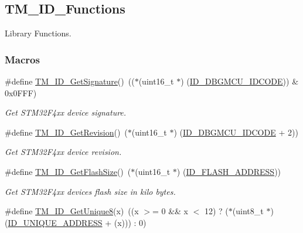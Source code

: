 \hypertarget{group___t_m___i_d___functions}{}\subsection{T\+M\+\_\+\+I\+D\+\_\+\+Functions}
\label{group___t_m___i_d___functions}


Library Functions.  


\subsubsection*{Macros}
\begin{DoxyCompactItemize}
\item 
\#define \hyperlink{group___t_m___i_d___functions_gaef7e65dccfaeaacc4f20c74da8e76d8b}{T\+M\+\_\+\+I\+D\+\_\+\+Get\+Signature}()~(($\ast$(uint16\+\_\+t $\ast$) (\hyperlink{group___t_m___i_d___macros_gad1789f86a55e8fc3c2c486dacf3df1a6}{I\+D\+\_\+\+D\+B\+G\+M\+C\+U\+\_\+\+I\+D\+C\+O\+D\+E})) \& 0x0\+F\+F\+F)
\begin{DoxyCompactList}\small\item\em Get S\+T\+M32\+F4xx device signature. \end{DoxyCompactList}\item 
\#define \hyperlink{group___t_m___i_d___functions_ga9a440783a624ab0a8411dcb36e8a415d}{T\+M\+\_\+\+I\+D\+\_\+\+Get\+Revision}()~($\ast$(uint16\+\_\+t $\ast$) (\hyperlink{group___t_m___i_d___macros_gad1789f86a55e8fc3c2c486dacf3df1a6}{I\+D\+\_\+\+D\+B\+G\+M\+C\+U\+\_\+\+I\+D\+C\+O\+D\+E} + 2))
\begin{DoxyCompactList}\small\item\em Get S\+T\+M32\+F4xx device revision. \end{DoxyCompactList}\item 
\#define \hyperlink{group___t_m___i_d___functions_ga6dfec7d283e405bbf6ca0593f9b6d43e}{T\+M\+\_\+\+I\+D\+\_\+\+Get\+Flash\+Size}()~($\ast$(uint16\+\_\+t $\ast$) (\hyperlink{group___t_m___i_d___macros_ga95fa471f6d9518cbf3228a2a6d69f5a7}{I\+D\+\_\+\+F\+L\+A\+S\+H\+\_\+\+A\+D\+D\+R\+E\+S\+S}))
\begin{DoxyCompactList}\small\item\em Get S\+T\+M32\+F4xx device\textquotesingle{}s flash size in kilo bytes. \end{DoxyCompactList}\item 
\#define \hyperlink{group___t_m___i_d___functions_ga66bf1f5c5762fb380eef6f00875faf3d}{T\+M\+\_\+\+I\+D\+\_\+\+Get\+Unique8}(x)~((x $>$= 0 \&\& x $<$ 12) ? ($\ast$(uint8\+\_\+t $\ast$) (\hyperlink{group___t_m___i_d___macros_ga631ce0b70a16d3e71bb83d4ad88552c2}{I\+D\+\_\+\+U\+N\+I\+Q\+U\+E\+\_\+\+A\+D\+D\+R\+E\+S\+S} + (x))) \+: 0)

\end{DoxyCompactItemize}
